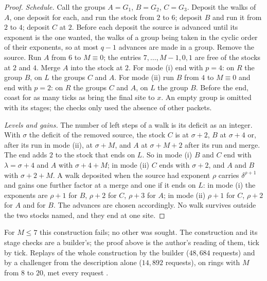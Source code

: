 \begin{proof}
\emph{Schedule.} Call the groups $A=G_1$, $B=G_2$, $C=G_3$. Deposit the walks of $A$, one deposit for each, and run the stock from $2$ to $6$; deposit $B$ and run it from $2$ to $4$; deposit $C$ at $2$. Before each deposit the source is advanced until its exponent is the one wanted, the walks of a group being taken in the cyclic order of their exponents, so at most $q-1$ advances are made in a group. Remove the source. Run $A$ from $6$ to $M\equiv0$; the entries $7,\dots,M-1,0,1$ are free of the stocks at $2$ and $4$. Merge $A$ into the stock at $2$. For mode (i) end with $p=4$: on $R$ the group $B$, on $L$ the groups $C$ and $A$. For mode (ii) run $B$ from $4$ to $M\equiv0$ and end with $p=2$: on $R$ the groups $C$ and $A$, on $L$ the group $B$. Before the end, coast for as many ticks as bring the final site to $x$. An empty group is omitted with its stages; the checks only used the absence of other packets.

\emph{Levels and gains.} The number of left steps of a walk is its deficit as an integer. With $\sigma$ the deficit of the removed source, the stock $C$ is at $\sigma+2$, $B$ at $\sigma+4$ or, after its run in mode (ii), at $\sigma+M$, and $A$ at $\sigma+M+2$ after its run and merge. The end adds $2$ to the stock that ends on $L$. So in mode (i) $B$ and $C$ end with $\lambda=\sigma+4$ and $A$ with $\sigma+4+M$; in mode (ii) $C$ ends with $\sigma+2$, and $A$ and $B$ with $\sigma+2+M$. A walk deposited when the source had exponent $\rho$ carries $\delta^{\rho+1}$ and gains one further factor at a merge and one if it ends on $L$: in mode (i) the exponents are $\rho+1$ for $B$, $\rho+2$ for $C$, $\rho+3$ for $A$; in mode (ii) $\rho+1$ for $C$, $\rho+2$ for $A$ and for $B$. The advances are chosen accordingly. No walk survives outside the two stocks named, and they end at one site.
\end{proof}

For $M\le7$ this construction fails; no other was sought. The construction and its stage checks are a builder's; the proof above is the author's reading of them, tick by tick. Replays of the whole construction by the builder ($48{,}684$ requests) and by a challenger from the description alone ($14{,}892$ requests), on rings with $M$ from $8$ to $20$, met every request \cite{comp4s}.

